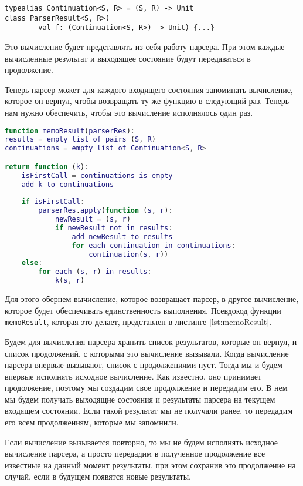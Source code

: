 \begin{lstlisting}[float=ht]
typealias Continuation<S, R> = (S, R) -> Unit
class ParserResult<S, R>(
        val f: (Continuation<S, R>) -> Unit) {...}
\end{lstlisting}

Это вычисление будет представлять из себя работу парсера. При этом каждые вычисленные результат и выходящее состояние будут передаваться в продолжение.

Теперь парсер может для каждого входящего состояния запоминать вычисление, которое он вернул, чтобы возвращать ту же функцию в следующий раз. Теперь нам нужно обеспечить, чтобы это вычисление исполнялось один раз.

\begin{lstlisting}[language=Matlab, label={lst:memoResult}, float=ht, caption=Мемоизация результата парсера]
function memoResult(parserRes):
results = empty list of pairs (S, R)
continuations = empty list of Continuation<S, R>

return function (k):
    isFirstCall = continuations is empty
    add k to continuations
    
    if isFirstCall:
        parserRes.apply(function (s, r):
            newResult = (s, r)
            if newResult not in results:
                add newResult to results
                for each continuation in continuations:
                    continuation(s, r))   
    else:
        for each (s, r) in results:
            k(s, r)
\end{lstlisting}

Для этого обернем вычисление, которое возвращает парсер, в другое вычисление, которое будет обеспечивать единственность выполнения.
Псевдокод функции \texttt{memoResult}, которая это делает, представлен в листинге \ref{lst:memoResult}.

Будем для вычисления парсера хранить список результатов, которые он вернул, и список продолжений, с которыми это вычисление вызывали. Когда вычисление парсера впервые вызывают, список с продолжениями пуст. Тогда мы и будем впервые исполнять исходное вычисление. Как известно, оно принимает продолжение, поэтому мы создадим свое продолжение и передадим его. В нем мы будем получать выходящие состояния и результаты парсера на текущем входящем состоянии. Если такой результат мы не получали ранее, то передадим его всем продолжениям, которые мы запомнили.

Если вычисление вызывается повторно, то мы не будем исполнять исходное вычисление парсера, а просто передадим в полученное продолжение все известные на данный момент результаты, при этом сохранив это продолжение на случай, если в будущем появятся новые результаты.

